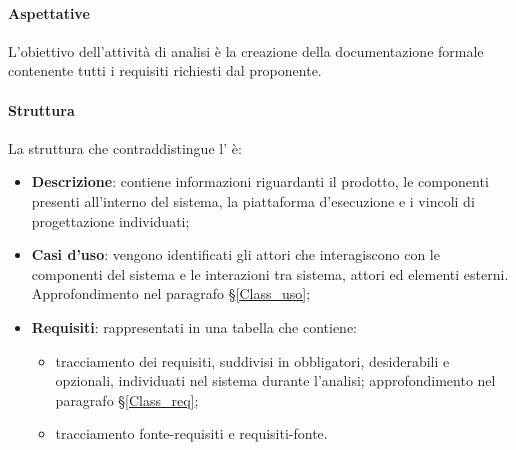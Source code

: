 \paragraph{Aspettative}
L'obiettivo dell'attività di analisi è la creazione della documentazione formale contenente tutti i requisiti richiesti dal proponente.
\paragraph{Struttura}
La struttura che contraddistingue l'\AdR{} è:
\begin{itemize}
	\item \textbf{Descrizione}: contiene informazioni riguardanti il prodotto, le componenti presenti all'interno del sistema, la piattaforma d'esecuzione e i vincoli di progettazione individuati;
	\item \textbf{Casi d'uso}: vengono identificati gli attori che interagiscono con le componenti del sistema e le interazioni tra sistema, attori ed elementi esterni. Approfondimento nel paragrafo \S{}\ref{Class_uso};
	\item \textbf{Requisiti}: rappresentati in una tabella che contiene:
	\begin{itemize}
 		\item tracciamento dei requisiti, suddivisi in obbligatori, desiderabili e opzionali, individuati nel sistema durante l'analisi; approfondimento nel paragrafo \S{}\ref{Class_req};
		\item tracciamento fonte-requisiti e requisiti-fonte. 
	\end{itemize}
\end{itemize}
